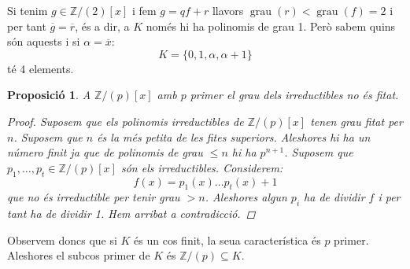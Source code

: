 \documentclass[a4paper,11pt]{report}
\DeclareMathOperator{\grau}{grau}
\renewcommand{\bar}{\overline}
\theoremstyle{theorem}
\newtheorem{proposicio}{\normalfont \sffamily\bfseries Proposició}[section]
\theoremstyle{definition}
\begin{document}
Si tenim $g\in \mathbb{Z}/(2)[x]$ i fem $g=qf+r$ llavors $\grau(r)<\grau(f)=2$ i per tant $\bar{g}=\bar{r}$, és a dir, a $K$ només hi ha polinomis de grau 1. Però sabem quins són aquests i si $\alpha=\bar{x}$:
$$K=\{0,1,\alpha,\alpha+1\}$$
té 4 elements.

\begin{proposicio}
A  $\mathbb{Z}/(p)[x]$ amb $p$ primer el grau dels irreductibles no és fitat.
\begin{proof}
Suposem que els polinomis irreductibles de $\mathbb{Z}/(p)[x]$ tenen grau fitat per $n$.  Suposem que $n$ és la més petita de les fites superiors. Aleshores hi ha un número finit ja que de  polinomis de grau $\leq n$ hi ha $p^{n+1}$. Suposem que $p_1,\ldots,p_t\in\mathbb{Z}/(p)[x]$ són els irreductibles. Considerem:
$$f(x)=p_1(x)\ldots p_t(x)+1$$ que no és irreductible per tenir grau $>n$. Aleshores algun $p_i$ ha de dividir $f$ i per tant ha de dividir 1. Hem arribat a contradicció.
\end{proof}
\end{proposicio}

Observem doncs que si $K$ és un cos finit, la seua característica és $p$ primer. Aleshores el subcos primer de $K$ és $\mathbb{Z}/(p)\subseteq K$.
\end{document}
